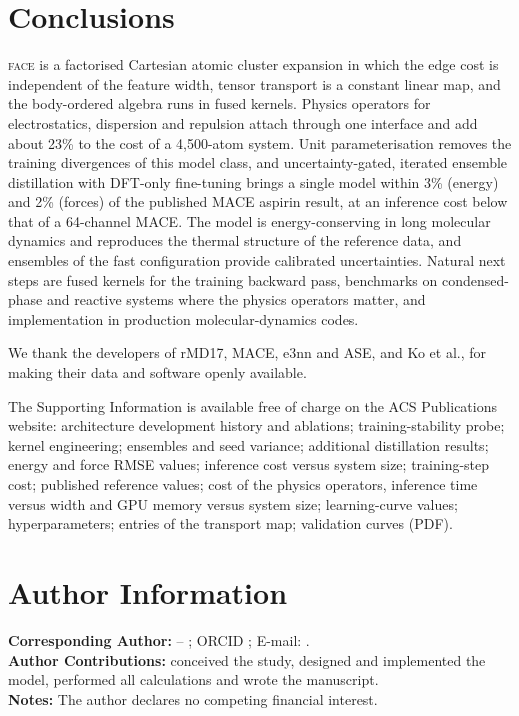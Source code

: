 \documentclass[journal=jctcce,manuscript=article,layout=traditional]{achemso}
\newcommand{\FACE}{\textup{\textsc{face}}}
\begin{document}
\section{Conclusions}
\FACE{} is a factorised Cartesian atomic cluster expansion in which the edge cost is independent of the feature width,
tensor transport is a constant linear map, and the body-ordered algebra runs in fused kernels. Physics operators for
electrostatics, dispersion and repulsion attach through one interface and add about 23\% to the cost of a
4,500-atom system. Unit parameterisation removes
the training divergences of this model class, and uncertainty-gated, iterated ensemble distillation with DFT-only
fine-tuning brings a single model within 3\% (energy) and 2\% (forces) of the published MACE aspirin result, at an
inference cost below that of a 64-channel MACE. The model is energy-conserving in long molecular dynamics and
reproduces the thermal structure of the reference data, and ensembles of the fast configuration provide calibrated
uncertainties. Natural next steps are fused kernels for the training backward pass, benchmarks on condensed-phase
and reactive systems where the physics operators matter, and implementation in production molecular-dynamics codes.

\begin{acknowledgement}
\Funding{} We thank the developers of rMD17, MACE, e3nn and ASE, and Ko et al., for making their data and
software openly available.
\end{acknowledgement}

\begin{suppinfo}
The Supporting Information is available free of charge on the ACS Publications website: architecture
development history and ablations; training-stability probe; kernel engineering; ensembles and seed variance;
additional distillation results; energy and force RMSE values; inference cost versus system size; training-step
cost; published reference values; cost of the physics operators, inference time versus width and GPU memory
versus system size; learning-curve values; hyperparameters; entries of the transport map; validation curves
(PDF).
\end{suppinfo}

\section*{Author Information}
\textbf{Corresponding Author:} \AuthorName{} -- \AuthorAffiliation; ORCID \AuthorORCID; E-mail:
\AuthorEmail.\\
\textbf{Author Contributions:} \AuthorName{} conceived the study, designed and implemented the model, performed
all calculations and wrote the manuscript.\\
\textbf{Notes:} The author declares no competing financial interest.
\end{document}
